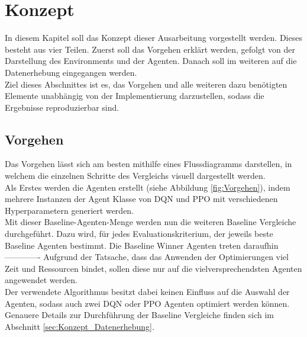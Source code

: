 \chapter{Konzept} \label{chap:Konzept}
In diesem Kapitel soll das Konzept dieser Ausarbeitung vorgestellt werden. Dieses besteht aus vier Teilen. Zuerst soll das Vorgehen erklärt werden, gefolgt von der Darstellung des Environments und der Agenten. Danach soll im weiteren auf die Datenerhebung eingegangen werden.\\
Ziel dieses Abschnittes ist es, das Vorgehen und alle weiteren dazu benötigten Elemente unabhängig von der Implementierung darzustellen, sodass die Ergebnisse reproduzierbar sind.

\section{Vorgehen} \label{sec:Konzept_Vorgehen}
Das Vorgehen lässt sich am besten mithilfe eines Flussdiagramms darstellen, in welchem die einzelnen Schritte des Vergleichs visuell dargestellt werden.\\
Als Erstes werden die Agenten erstellt (siehe Abbildung \ref{fig:Vorgehen}), indem mehrere Instanzen der Agent Klasse von DQN und PPO mit verschiedenen Hyperparametern generiert werden.\\
Mit dieser Baseline-Agenten-Menge werden nun die weiteren Baseline Vergleiche durchgeführt. Dazu wird, für jedes Evaluationskriterium, der jeweils beste Baseline Agenten bestimmt. Die Baseline Winner Agenten treten daraufhin -------------
Aufgrund der Tatsache, dass das Anwenden der Optimierungen viel Zeit und Ressourcen bindet, sollen diese nur auf die vielversprechendsten Agenten angewendet werden.\\
Der verwendete Algorithmus besitzt dabei keinen Einfluss auf die Auswahl der Agenten, sodass auch zwei DQN oder PPO Agenten optimiert werden können. Genauere Details zur Durchführung der Baseline Vergleiche finden sich im Abschnitt \ref{sec:Konzept_Datenerhebung}.
